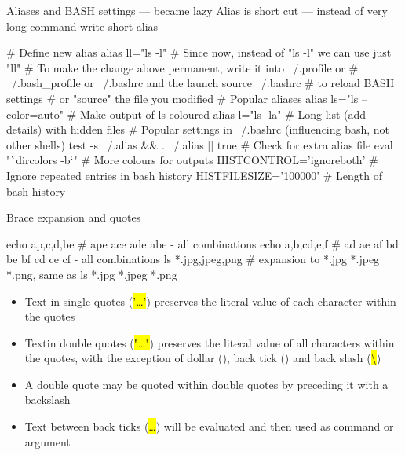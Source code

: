 \documentclass[compress, ucs, xelatex, 11pt, xcolor=svgnames,
  hyperref={
    bookmarks=true,
    unicode=true,
    colorlinks=true,
    pdftitle={Linux, command line and MetaCentrum},
    plainpages=false,
    pdfauthor={Vojtech Zeisek},
    pdfsubject={Course about use of Linux command line, writing shell scripts and using MetaCentrum of CESNET},
    pdfcreator={XeLaTeX, http://www.xelatex.org/},
    pdfkeywords={Linux, GNU, BASH, shell, command line, MetaCentrum},
    linkcolor=Sienna,
    anchorcolor=black,
    citecolor=green,
    filecolor=magenta,
    menucolor=Sienna,
    urlcolor=cyan,
    pdftex},
  url={hyphens, lowtilde} %
  ]{beamer}
\renewcommand{\texttt}[1]{\hl{\ttfamily #1}}
\begin{document}
\begin{frame}[fragile]{Aliases and BASH settings --- became lazy}
Alias is short cut --- instead of very long command write short alias
  \begin{bashcode}
    # Define new alias
    alias ll="ls -l"
    # Since now, instead of "ls -l" we can use just "ll"
    # To make the change above permanent, write it into ~/.profile or
    # ~/.bash_profile or ~/.bashrc and the launch
    source ~/.bashrc # to reload BASH settings
    # or "source" the file you modified
    # Popular aliases
    alias ls="ls --color=auto" # Make output of ls coloured
    alias l="ls -la" # Long list (add details) with hidden files
    # Popular settings in ~/.bashrc (influencing bash, not other shells)
    test -s ~/.alias && . ~/.alias || true # Check for extra alias file
    eval "`dircolors -b`" # More colours for outputs
    HISTCONTROL='ignoreboth' # Ignore repeated entries in bash history
    HISTFILESIZE='100000' # Length of bash history
  \end{bashcode}
\end{frame}

\begin{frame}[fragile]{Brace expansion and quotes}
  \begin{bashcode}
    echo a{p,c,d,b}e # ape ace ade abe - all combinations
    echo {a,b,c}{d,e,f} # ad ae af bd be bf cd ce cf - all combinations
    ls *.{jpg,jpeg,png} # expansion to *.jpg *.jpeg *.png, same as
    ls *.jpg *.jpeg *.png
  \end{bashcode}
\begin{itemize}
  \item Text in single quotes (\texttt{'\ldots'}) preserves the literal value of each character within the quotes
  \item Textin double quotes (\texttt{"\ldots"}) preserves the literal value of all characters within the quotes, with the exception of dollar (\texttt{\textdollar}), back tick (\texttt{\textasciigrave}) and back slash (\texttt{\textbackslash})
  \item A double quote may be quoted within double quotes by preceding it with a backslash
  \item Text between back ticks (\texttt{\textasciigrave\ldots\textasciigrave}) will be evaluated and then used as command or argument
\end{itemize}
\end{frame}
\end{document}
